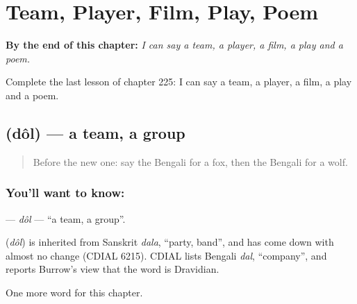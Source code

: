 
\chapter{Team, Player, Film, Play, Poem}
\label{ch:bn-team-player-film-play-poem}

\begin{chapteropening}
\textbf{By the end of this chapter:} \emph{I can say a team, a player, a film, a play and a poem.}

Complete the last lesson of chapter 225: I can say a team, a player, a film, a play and a poem.
\end{chapteropening}

\section[\texorpdfstring{\bn{দল} (dôl)}{দল (dôl)}]{ (dôl) — a team, a group}

\label{lesson:BN-C225-dol}



\begin{quote}
Before the new one: say the Bengali for a fox, then the Bengali for a wolf.
\end{quote}

\subsection*{You'll want to know: }
\textbf{} — \emph{dôl} — \textquotedblleft{}a team, a group\textquotedblright{}.

\begin{cousinweb}
\textbf{} (\emph{dôl}) is inherited from Sanskrit \emph{dala}, \textquotedblleft{}party, band\textquotedblright{}, and has come down with almost no change (CDIAL 6215). CDIAL lists Bengali \emph{dal}, \textquotedblleft{}company\textquotedblright{}, and reports Burrow's view that the word is Dravidian.
\end{cousinweb}

\begin{grammarlens}[title={What you've built}]
One more word for this chapter.
\end{grammarlens}

